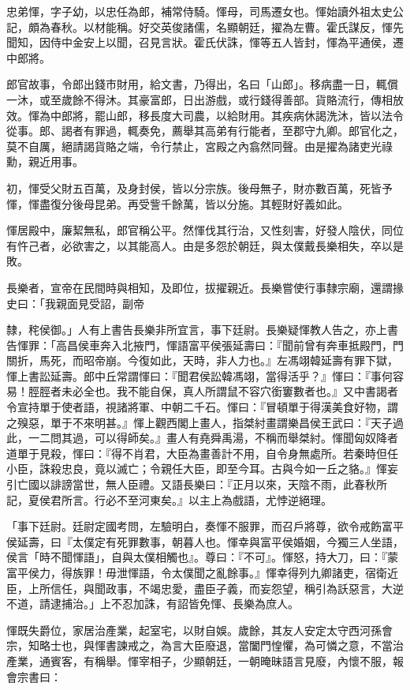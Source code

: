 \begin{pinyinscope}
忠弟惲，字子幼，以忠任為郎，補常侍騎。惲母，司馬遷女也。惲始讀外祖太史公記，頗為春秋。以材能稱。好交英俊諸儒，名顯朝廷，擢為左曹。霍氏謀反，惲先聞知，因侍中金安上以聞，召見言狀。霍氏伏誅，惲等五人皆封，惲為平通侯，遷中郎將。

郎官故事，令郎出錢市財用，給文書，乃得出，名曰「山郎」。移病盡一日，輒償一沐，或至歲餘不得沐。其豪富郎，日出游戲，或行錢得善部。貨賂流行，傳相放效。惲為中郎將，罷山郎，移長度大司農，以給財用。其疾病休謁洗沐，皆以法令從事。郎、謁者有罪過，輒奏免，薦舉其高弟有行能者，至郡守九卿。郎官化之，莫不自厲，絕請謁貨賂之端，令行禁止，宮殿之內翕然同聲。由是擢為諸吏光祿勳，親近用事。

初，惲受父財五百萬，及身封侯，皆以分宗族。後母無子，財亦數百萬，死皆予惲，惲盡復分後母昆弟。再受訾千餘萬，皆以分施。其輕財好義如此。

惲居殿中，廉絜無私，郎官稱公平。然惲伐其行治，又性刻害，好發人陰伏，同位有忤己者，必欲害之，以其能高人。由是多怨於朝廷，與太僕戴長樂相失，卒以是敗。

長樂者，宣帝在民間時與相知，及即位，拔擢親近。長樂嘗使行事隸宗廟，還謂掾史曰：「我親面見受詔，副帝

隸，秺侯御。」人有上書告長樂非所宜言，事下廷尉。長樂疑惲教人告之，亦上書告惲罪：「高昌侯車奔入北掖門，惲語富平侯張延壽曰：『聞前曾有奔車抵殿門，門關折，馬死，而昭帝崩。今復如此，天時，非人力也。』左馮翊韓延壽有罪下獄，惲上書訟延壽。郎中丘常謂惲曰：『聞君侯訟韓馮翊，當得活乎？』惲曰：『事何容易！脛脛者未必全也。我不能自保，真人所謂鼠不容穴銜窶數者也。』又中書謁者令宣持單于使者語，視諸將軍、中朝二千石。惲曰：『冒頓單于得漢美食好物，謂之殠惡，單于不來明甚。』惲上觀西閣上畫人，指桀紂畫謂樂昌侯王武曰：『天子過此，一二問其過，可以得師矣。』畫人有堯舜禹湯，不稱而舉桀紂。惲聞匈奴降者道單于見殺，惲曰：『得不肖君，大臣為畫善計不用，自令身無處所。若秦時但任小臣，誅殺忠良，竟以滅亡；令親任大臣，即至今耳。古與今如一丘之貉。』惲妄引亡國以誹謗當世，無人臣禮。又語長樂曰：『正月以來，天陰不雨，此春秋所記，夏侯君所言。行必不至河東矣。』以主上為戲語，尤悖逆絕理。

「事下廷尉。廷尉定國考問，左驗明白，奏惲不服罪，而召戶將尊，欲令戒飭富平侯延壽，曰『太僕定有死罪數事，朝暮人也。惲幸與富平侯婚姻，今獨三人坐語，侯言「時不聞惲語」，自與太僕相觸也』。尊曰：『不可』。惲怒，持大刀，曰：『蒙富平侯力，得族罪！毋泄惲語，令太僕聞之亂餘事。』惲幸得列九卿諸吏，宿衛近臣，上所信任，與聞政事，不竭忠愛，盡臣子義，而妄怨望，稱引為訞惡言，大逆不道，請逮捕治。」上不忍加誅，有詔皆免惲、長樂為庶人。

惲既失爵位，家居治產業，起室宅，以財自娛。歲餘，其友人安定太守西河孫會宗，知略士也，與惲書諫戒之，為言大臣廢退，當闔門惶懼，為可憐之意，不當治產業，通賓客，有稱舉。惲宰相子，少顯朝廷，一朝晻昧語言見廢，內懷不服，報會宗書曰：


\end{pinyinscope}
